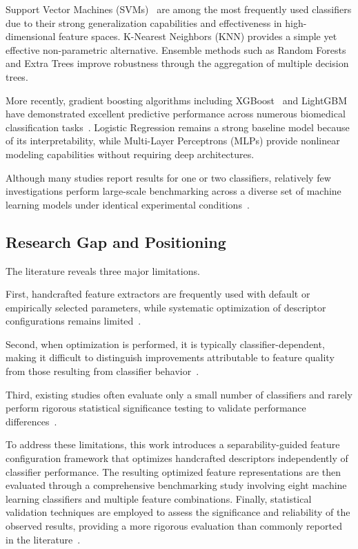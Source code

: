 Support Vector Machines (SVMs)~\cite{cortes1995} are among the most frequently
used classifiers due to their strong generalization capabilities and
effectiveness in high-dimensional feature spaces. K-Nearest Neighbors (KNN)
provides a simple yet effective non-parametric alternative. Ensemble methods
such as Random Forests~\cite{breiman2001} and Extra Trees improve robustness
through the aggregation of multiple decision trees.

More recently, gradient boosting algorithms including XGBoost~\cite{chen2016}
and LightGBM~\cite{ke2017} have demonstrated excellent predictive performance
across numerous biomedical classification tasks~\cite{tseng2023,safy2026}.
Logistic Regression remains a strong baseline model because of its
interpretability, while Multi-Layer Perceptrons (MLPs) provide nonlinear
modeling capabilities without requiring deep architectures.

Although many studies report results for one or two classifiers, relatively few
investigations perform large-scale benchmarking across a diverse set of machine
learning models under identical experimental conditions~\cite{kumar2024,ottoni2025}.

\subsection{Research Gap and Positioning}
\label{sec:rw_positioning}
The literature reveals three major limitations.

First, handcrafted feature extractors are frequently used with default or
empirically selected parameters, while systematic optimization of descriptor
configurations remains limited~\cite{basthikodi2024,dheepak2024}.

Second, when optimization is performed, it is typically classifier-dependent,
making it difficult to distinguish improvements attributable to feature quality
from those resulting from classifier behavior~\cite{nawaz2022,tseng2023}.

Third, existing studies often evaluate only a small number of classifiers and
rarely perform rigorous statistical significance testing to validate performance
differences~\cite{pattanaik2022,pintodossantos2020}.

To address these limitations, this work introduces a separability-guided feature
configuration framework that optimizes handcrafted descriptors independently of
classifier performance. The resulting optimized feature representations are then
evaluated through a comprehensive benchmarking study involving eight machine
learning classifiers and multiple feature combinations. Finally, statistical
validation techniques are employed to assess the significance and reliability of
the observed results, providing a more rigorous evaluation than commonly reported
in the literature~\cite{pintodossantos2020,ottoni2025}.
